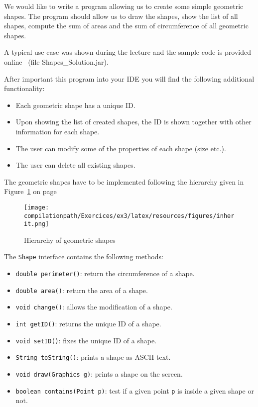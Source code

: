

We would like to write a program allowing us to create some simple geometric
shapes. The program should allow us to draw the shapes, show the list of all
shapes, compute the sum of areas and the sum of circumference of all
geometric shapes.

A typical use-case was shown during the lecture and the sample code is provided
online~\cite{WEBGL} (file Shapes\_Solution.jar).

After important this program into your IDE you will find the following
additional functionality:
\begin{itemize}
 \item Each geometric shape has a unique ID.
 \item Upon showing the list of created shapes, the ID is shown together with
other information for each shape.
\item The user can modify some of the properties of each shape (size etc.).
\item The user can delete all existing shapes.
\end{itemize}

The geometric shapes have to be implemented following the hierarchy given in
Figure~\ref{Inherit} on page~\pageref{Inherit}


\begin{figure}[htb]
  \begin{center}
\texttt{[image: \\compilationpath/Exercices/ex3/latex/resources/figures/inherit.png]}
    \caption{Hierarchy of geometric shapes}
    \label{Inherit}
  \end{center}
\end{figure}

The \texttt{Shape} interface contains the following methods:
\begin{itemize}
 \item \texttt{double perimeter()}: return the circumference of a shape.
 \item \texttt{double area()}: return the area of a shape.
 \item \texttt{void change()}: allows the modification of a shape.
 \item \texttt{int getID()}: returns the unique ID of a shape.
 \item \texttt{void setID()}: fixes the unique ID of a shape.
 \item \texttt{String toString()}: prints a shape as ASCII text.
 \item \texttt{void draw(Graphics g)}: prints a shape on the screen.
 \item \texttt{boolean contains(Point p)}: test if a given point \texttt{p} is
inside a given shape or not.
\end{itemize}

